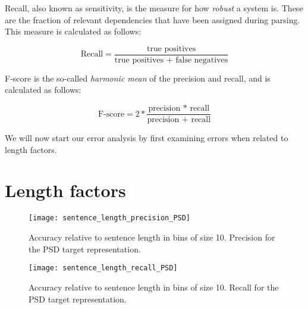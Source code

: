 Recall, also known as sensitivity, is the measure for how \textit{robust} a system is. These are the fraction of relevant dependencies that have been assigned during parsing. This measure is calculated as follows:

\begin{equation*}
    \text{Recall} = \frac{\text{true positives}}{\text{true positives + false
            negatives}}
\end{equation*}

\vspace{1ex}

F-score is the so-called \textit{harmonic mean} of the precision and recall, and is calculated as follows:

\begin{equation*}
    \text{F-score} = 2*\frac{\text{precision * recall}}{\text{precision + recall}}
\end{equation*}

\vspace{1ex}

We will now start our error analysis by first examining errors when related to length factors.
    
\section{Length factors}

\begin{figure}[h]
    \centering
    \begin{minipage}{0.8\textwidth}
        \centering
        \texttt{[image: sentence\_length\_precision\_PSD]}
    \end{minipage}
    \caption{Accuracy relative to sentence length in bins of size 10. Precision for the PSD target representation.}
    \label{fig:s_length_PSD_1}
\end{figure}

\begin{figure}[h]
    \centering
    \begin{minipage}{0.8\textwidth}
        \centering
        \texttt{[image: sentence\_length\_recall\_PSD]}
    \end{minipage}\hfill
    \caption{Accuracy relative to sentence length in bins of size 10. Recall for the PSD target representation.}
    \label{fig:s_length_PSD_2}
\end{figure}

